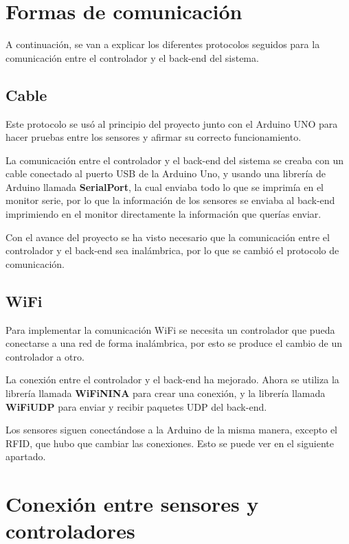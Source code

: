 \section{Formas de comunicación}

A continuación, se van a explicar los diferentes protocolos seguidos para la comunicación entre el controlador y el back-end del sistema.

\subsection{Cable}

Este protocolo se usó al principio del proyecto junto con el Arduino UNO para hacer pruebas entre los sensores y afirmar su correcto funcionamiento. 

La comunicación entre el controlador y el back-end del sistema se creaba con un cable conectado al puerto USB de la Arduino Uno, y usando una librería de Arduino llamada \textbf{SerialPort}\cite{twentninth}, la cual enviaba todo lo que se imprimía en el monitor serie, por lo que la información de los sensores se enviaba al back-end imprimiendo en el monitor directamente la información que querías enviar.

Con el avance del proyecto se ha visto necesario que la comunicación entre el controlador y el back-end sea inalámbrica, por lo que se cambió el protocolo de comunicación.

\subsection{WiFi}

Para implementar la comunicación WiFi se necesita un controlador que pueda conectarse a una red de forma inalámbrica, por esto se produce el cambio de un controlador a otro.

La conexión entre el controlador y el back-end ha mejorado. Ahora se utiliza la librería llamada \textbf{WiFiNINA}\cite{thirtieth} para crear una conexión, y la librería llamada \textbf{WiFiUDP}\cite{thirtysecond} para enviar y recibir paquetes UDP del back-end.

Los sensores siguen conectándose a la Arduino de la misma manera, excepto el RFID, que hubo que cambiar las conexiones. Esto se puede ver en el siguiente apartado.

\section{Conexión entre sensores y controladores}

